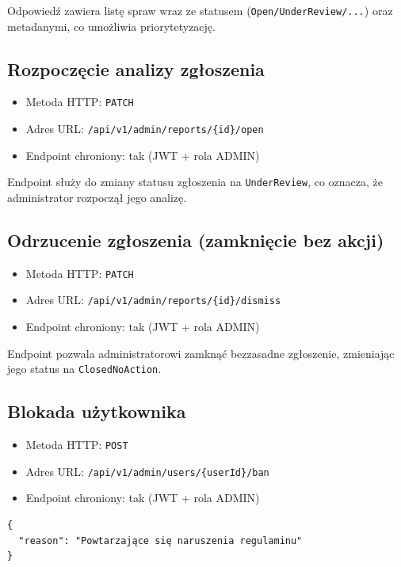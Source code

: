 \documentclass[11pt, a4paper]{article}
\begin{document}
\begin{itemize}
\noindent Odpowiedź zawiera listę spraw wraz ze statusem (\texttt{Open/UnderReview/...}) oraz metadanymi, co umożliwia priorytetyzację.

\subsection{Rozpoczęcie analizy zgłoszenia}
\begin{itemize}
    \item Metoda HTTP: \texttt{PATCH}
    \item Adres URL: \texttt{/api/v1/admin/reports/\{id\}/open}
    \item Endpoint chroniony: tak (JWT + rola ADMIN)
\end{itemize}

\noindent Endpoint służy do zmiany statusu zgłoszenia na \texttt{UnderReview}, co oznacza, że administrator rozpoczął jego analizę.

\subsection{Odrzucenie zgłoszenia (zamknięcie bez akcji)}
\begin{itemize}
    \item Metoda HTTP: \texttt{PATCH}
    \item Adres URL: \texttt{/api/v1/admin/reports/\{id\}/dismiss}
    \item Endpoint chroniony: tak (JWT + rola ADMIN)
\end{itemize}

\noindent Endpoint pozwala administratorowi zamknąć bezzasadne zgłoszenie, zmieniając jego status na \texttt{ClosedNoAction}.

\subsection{Blokada użytkownika}
\begin{itemize}
    \item Metoda HTTP: \texttt{POST}
    \item Adres URL: \texttt{/api/v1/admin/users/\{userId\}/ban}
    \item Endpoint chroniony: tak (JWT + rola ADMIN)
\end{itemize}

\begin{lstlisting}[style=json,caption={Ciało żądania — blokada użytkownika}]
{
  "reason": "Powtarzające się naruszenia regulaminu"
}
\end{lstlisting}


\end{itemize}
\end{document}
